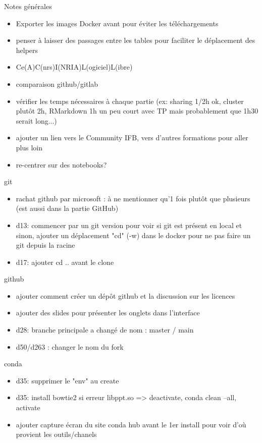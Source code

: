 
\begin{frame}{Notes générales}
\begin{itemize}
  \item Exporter les images Docker avant pour éviter les téléchargements
  \item penser à laisser des passages entre les tables pour faciliter le déplacement des helpers
  \item Ce(A)C(nrs)I(NRIA)L(ogiciel)L(ibre)
  \item comparaison github/gitlab
  \item vérifier les temps nécessaires à chaque partie (ex: sharing 1/2h ok, cluster plutôt 2h, RMarkdown 1h un peu court avec TP mais probablement que 1h30 serait long...)
  \item ajouter un lien vers le Community IFB, vers d'autres formations pour aller plus loin
  \item re-centrer sur des notebooks?
\end{itemize}
\end{frame}

\begin{frame}{git}
\begin{itemize}
  \item rachat github par microsoft : à ne mentionner qu'1 fois plutôt que plusieurs (est aussi dans la partie GitHub)
  \item d13: commencer par un git version pour voir si git est présent en local et sinon, ajouter un déplacement "cd" (-w) dans le docker pour ne pas faire un git depuis la racine
  \item d17: ajouter cd .. avant le clone
\end{itemize}
\end{frame}

\begin{frame}{github}
\begin{itemize}
  \item ajouter comment créer un dépôt github et la discussion sur les licences
  \item ajouter des slides pour présenter les onglets dans l'interface
  \item d28: branche principale a changé de nom : master / main
  \item d50/d263 : changer le nom du fork
\end{itemize}
\end{frame}

\begin{frame}{conda}
\begin{itemize}
  \item d35: supprimer le "env" au create
  \item d35: install bowtie2 si erreur libppt.so => deactivate, conda clean --all, activate
  \item ajouter capture écran du site conda hub avant le 1er install pour voir d'où provient les outils/chanels
\end{itemize}
\end{frame}

